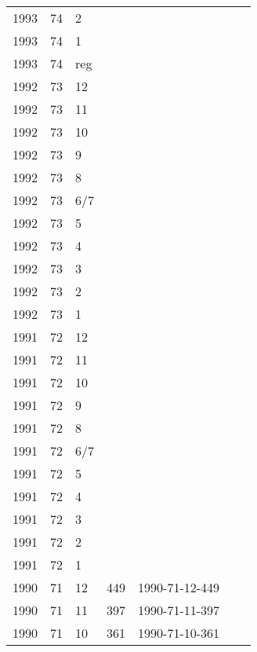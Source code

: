 \begin{longtable}{ |l|l|l|l|p{2.7cm}|l|p{2cm}| }
 1993 & 74 &     2 &         &                &  & \\
 1993 & 74 &     1 &         &                &  & \\
 1993 & 74 &   reg &         &                &  & \\
 1992 & 73 &    12 &         &                &  & \\
 1992 & 73 &    11 &         &                &  & \\
 1992 & 73 &    10 &         &                &  & \\
 1992 & 73 &     9 &         &                &  & \\
 1992 & 73 &     8 &         &                &  & \\
 1992 & 73 &   6/7 &         &                &  & \\
 1992 & 73 &     5 &         &                &  & \\
 1992 & 73 &     4 &         &                &  & \\
 1992 & 73 &     3 &         &                &  & \\
 1992 & 73 &     2 &         &                &  & \\
 1992 & 73 &     1 &         &                &  & \\
 1991 & 72 &    12 &         &                &  & \\
 1991 & 72 &    11 &         &                &  & \\
 1991 & 72 &    10 &         &                &  & \\
 1991 & 72 &     9 &         &                &  & \\
 1991 & 72 &     8 &         &                &  & \\
 1991 & 72 &   6/7 &         &                &  & \\
 1991 & 72 &     5 &         &                &  & \\
 1991 & 72 &     4 &         &                &  & \\
 1991 & 72 &     3 &         &                &  & \\
 1991 & 72 &     2 &         &                &  & \\
 1991 & 72 &     1 &         &                &  & \\
 1990 & 71 &    12 &   449   & 1990-71-12-449 &  & \\
 1990 & 71 &    11 &    397  & 1990-71-11-397 &  & \\
 1990 & 71 &    10 &    361  & 1990-71-10-361 &  & \\

\end{longtable}
